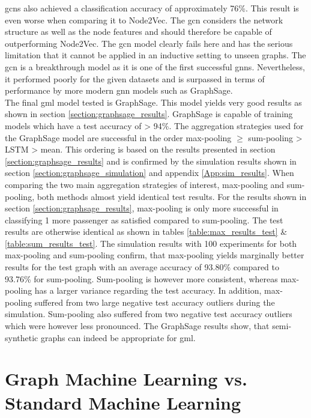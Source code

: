   \noindent \acsp{gcn} also achieved a classification accuracy of approximately 
  76\%. This result is even worse when comparing it to Node2Vec. The \acs{gcn} 
  considers the network structure as well as the node features and should 
  therefore be capable of outperforming Node2Vec. The \acs{gcn} model clearly 
  fails here and has the serious limitation that it cannot be applied in an 
  inductive setting to unseen graphs. The \acs{gcn} is a breakthrough model 
  as it is one of the first successful \acsp{gnn}. Nevertheless, it 
  performed poorly for the given datasets and is surpassed in terms of 
  performance by more modern \acs{gnn} models such as GraphSage. \\

  \noindent The final \acs{gml} model tested is GraphSage. This model yields 
  very good results as shown in section \ref{section:graphsage_results}. 
  GraphSage is capable of training models which have a test accuracy of > 94\%. 
  The aggregation strategies used for the GraphSage model are successful in the 
  order max-pooling $\geqslant$ sum-pooling > LSTM > mean. This ordering is 
  based on the results presented in section \ref{section:graphsage_results} and 
  is confirmed by the simulation results shown in section 
  \ref{section:graphsage_simulation} and appendix \ref{App:sim_results}. 
  When comparing the two main aggregation strategies of interest, max-pooling 
  and sum-pooling, both methods almost yield identical test results. For the
  results shown in section \ref{section:graphsage_results}, max-pooling is only 
  more successful in classifying 1 more passenger as satisfied compared to
  sum-pooling. The test results are otherwise identical as shown in tables 
  \ref{table:max_results_test} \& \ref{table:sum_results_test}. The simulation
  results with 100 experiments for both max-pooling and sum-pooling confirm,
  that max-pooling yields marginally better results for the test graph with an
  average accuracy of 93.80\% compared to 93.76\% for sum-pooling. Sum-pooling
  is however more consistent, whereas max-pooling has a larger variance 
  regarding the test accuracy. In addition, max-pooling suffered from two large 
  negative test accuracy outliers during the simulation. Sum-pooling also 
  suffered from two negative test accuracy outliers which were however less 
  pronounced. The GraphSage results show, that semi-synthetic graphs can indeed 
  be appropriate for \acs{gml}.

  \section[GML vs. Standard ML]{Graph Machine Learning vs. Standard Machine Learning}
  \label{section:comp_disc}

